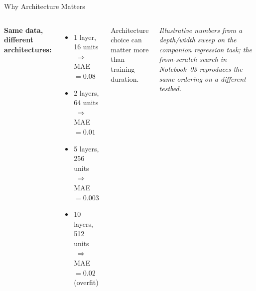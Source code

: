 \documentclass[aspectratio=169,11pt]{beamer}
\newcommand{\emphc}[1]{\textcolor{harvardcrimson}{#1}}
\begin{document}
\begin{frame}{Why Architecture Matters}
\begin{columns}[T]
\textbf{Same data, different architectures:}
\vspace{0.3cm}
\begin{itemize}
    \item 1 layer, 16 units $\;\Rightarrow\;$ MAE $= 0.08$
    \item 2 layers, 64 units $\;\Rightarrow\;$ MAE $= 0.01$
    \item 5 layers, 256 units $\;\Rightarrow\;$ MAE $= 0.003$
    \item 10 layers, 512 units $\;\Rightarrow\;$ MAE $= 0.02$ (overfit)
\end{itemize}
\vspace{0.3cm}
Architecture choice can matter \emphc{more than training duration}.

\vspace{0.25cm}
{\scriptsize\itshape Illustrative numbers from a depth/width sweep on the companion regression task; the from-scratch search in Notebook~03 reproduces the same ordering on a different testbed.}

\end{columns}
\end{frame}
\end{document}
